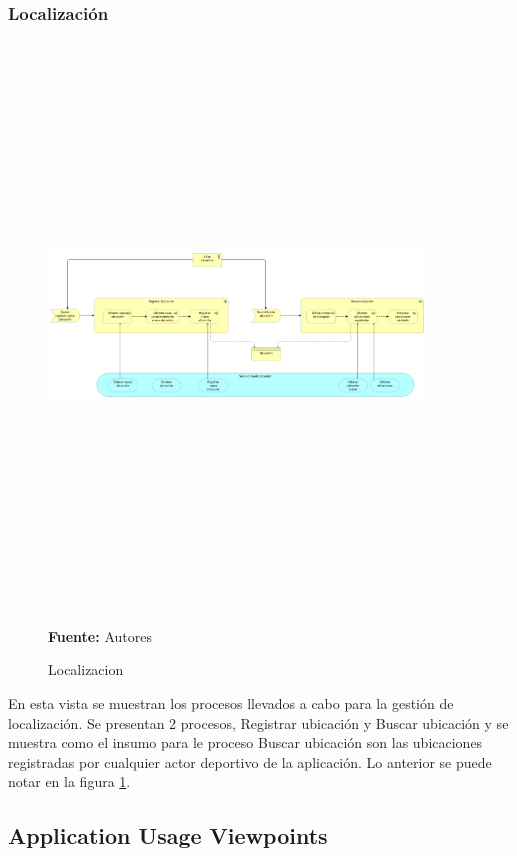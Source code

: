 \subsubsection{Localización}

\begin{figure}[!htb]
  \begin{center}
    \includegraphics[angle=90,width=10cm,height=15cm]{./imagenes/Archimate/vistas/business_process/localizacion.png}
    \caption{Localizacion}
    \label{fig:BP_localizacion}
    \textbf{Fuente:}  Autores \\
  \end{center}
\end{figure}

En esta vista se muestran los procesos llevados a cabo para la gestión de localización. Se presentan 2 procesos, Registrar ubicación y Buscar ubicación y se muestra como el insumo para le proceso Buscar ubicación son las ubicaciones registradas por cualquier actor deportivo de la aplicación. Lo anterior se puede notar en la figura \ref{fig:BP_localizacion}.

\subsection{Application Usage Viewpoints}

